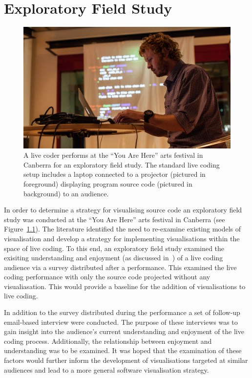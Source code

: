 
\chapter{Exploratory Field Study}
\label{chap:exploratory-field-study}

\begin{figure}
\centering
\includegraphics[width=1.0\textwidth]{../images/study-1-you-are-here-ben.jpg}
\caption[Standard live coding setup]{A live coder performs at the ``You Are Here'' arts festival in Canberra for an exploratory field study. The standard live coding setup includes a laptop connected to a projector (pictured in foreground) displaying program source code (pictured in background) to an audience.}
\label{fig:exploratory-field-study-ben}
\end{figure}


In order to determine a strategy for visualising source code an exploratory field study was conducted at the ``You Are Here'' arts festival in Canberra (see Figure~\ref{fig:exploratory-field-study-ben}). The literature identified the need to re-examine existing models of visualisation and develop a strategy for implementing visualisations within the space of live coding. To this end, an exploratory field study examined the exisiting understanding and enjoyment (as discussed in~\cite{McLean2010a}) of a live coding audience via a survey distributed after a performance. This examined the live coding performance with only the source code projected without any visualiasation. This would provide a baseline for the addition of visualisations to live coding.

In addition to the survey distributed during the performance a set of follow-up email-based interview were conducted. The purpose of these interviews was to gain insight into the audience's current understanding and enjoyment of the live coding process. Additionally, the relationship between enjoyment and understanding was to be examined. It was hoped that the examination of these factors would further inform the development of visualisations targeted at similar audiences and lead to a more general software visualisation strategy.

